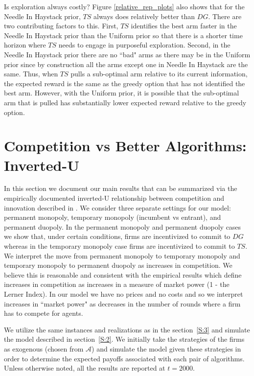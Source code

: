 \documentclass{article}
\theoremstyle{definition}
\begin{document}
Is exploration always costly? Figure \ref{relative_rep_plots} also shows that for the Needle In Haystack prior, $TS$ always does relatively better than $DG$. There are two contributing factors to this. First, $TS$ identifies the best arm faster in the Needle In Haystack prior than the Uniform prior so that there is a shorter time horizon where $TS$ needs to engage in purposeful exploration. Second, in the Needle In Haystack prior there are no ``bad" arms as there may be in the Uniform prior since by construction all the arms except one in Needle In Haystack are the same. Thus, when $TS$ pulls a sub-optimal arm relative to its current information, the expected reward is the same as the greedy option that has not identified the best arm. However, with the Uniform prior, it is possible that the sub-optimal arm that is pulled has substantially lower expected reward relative to the greedy option.

\section{Competition vs Better Algorithms: Inverted-U}
\label{S:5}

In this section we document our main results that can be summarized via the empirically documented inverted-U relationship between competition and innovation described in \citet{aghion2005competition}. We consider three separate settings for our model: permanent monopoly, temporary monopoly (incumbent vs entrant), and permanent duopoly. In the permanent monopoly and permanent duopoly cases we show that, under certain conditions, firms are incentivized to commit to $DG$ whereas in the temporary monopoly case firms are incentivized to commit to $TS$. We interpret the move from permanent monopoly to temporary monopoly and temporary monopoly to permanent duopoly as increases in competition. We believe this is reasonable and consistent with the empirical results which define increases in competition as increases in a measure of market power (1 - the Lerner Index). In our model we have no prices and no costs and so we interpret increases in ``market power" as decreases in the number of rounds where a firm has to compete for agents.

We utilize the same instances and realizations as in the section~\ref{S:3} and simulate the model described in section~\ref{S:2}. We initially take the strategies of the firms as exogenous (chosen from $\mathcal{A}$) and simulate the model given these strategies in order to determine the expected payoffs associated with each pair of algorithms. Unless otherwise noted, all the results are reported at $t = 2000$.
\end{document}
